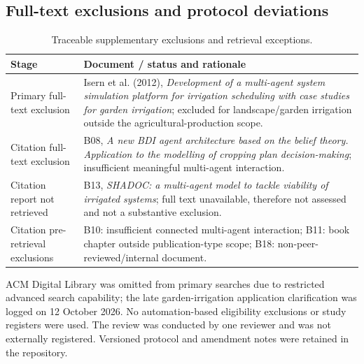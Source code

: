 \subsection{Full-text exclusions and protocol deviations}
\begin{table}[htbp]\centering\footnotesize
\caption{Traceable supplementary exclusions and retrieval exceptions.}\label{tab:app_exceptions}
\begin{tabularx}{\textwidth}{@{}p{}X@{}}\toprule Stage & Document / status and rationale \\\midrule
Primary full-text exclusion & Isern et al. (2012), \emph{Development of a multi-agent system simulation platform for irrigation scheduling with case studies for garden irrigation}; excluded for landscape/garden irrigation outside the agricultural-production scope.\\
Citation full-text exclusion & B08, \emph{A new BDI agent architecture based on the belief theory. Application to the modelling of cropping plan decision-making}; insufficient meaningful multi-agent interaction.\\
Citation report not retrieved & B13, \emph{SHADOC: a multi-agent model to tackle viability of irrigated systems}; full text unavailable, therefore not assessed and not a substantive exclusion.\\
Citation pre-retrieval exclusions & B10: insufficient connected multi-agent interaction; B11: book chapter outside publication-type scope; B18: non-peer-reviewed/internal document.\\
\bottomrule\end{tabularx}\end{table}
ACM Digital Library was omitted from primary searches due to restricted advanced search capability; the late garden-irrigation application clarification was logged on 12 October 2026. No automation-based eligibility exclusions or study registers were used. The review was conducted by one reviewer and was not externally registered. Versioned protocol and amendment notes were retained in the repository.
